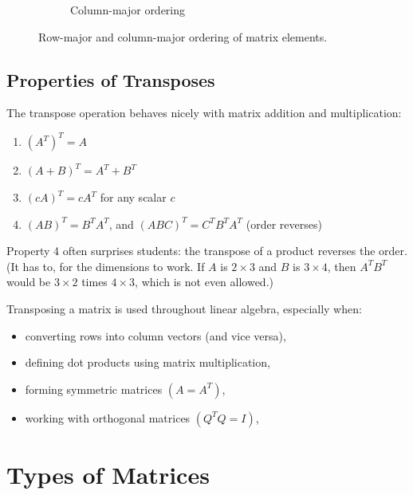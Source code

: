 \begin{figure}[H]
\begin{subfigure}{0.45\textwidth}
        \caption{Column-major ordering}
        \label{fig:col_major}
    \end{subfigure}
    \caption{Row-major and column-major ordering of matrix elements.}
    \label{fig:row_col_major}
\end{figure}
\subsection{Properties of Transposes}

The transpose operation behaves nicely with matrix addition and multiplication:
\begin{enumerate}[label=(\arabic*)]
    \item $(A^T)^T = A$
    \item \((A + B)^T = A^T + B^T\)
    \item \((cA)^T = cA^T\) for any scalar $c$
    \item \((AB)^T = B^T A^T\), and \((ABC)^T = C^T B^T A^T\) (order reverses)
    
\end{enumerate}
Property 4 often surprises students: the transpose of a product reverses the order. (It has to, for the dimensions to work. If $A$ is $2 \times 3$ and $B$ is $3 \times 4$, then $A^T B^T$ would be $3 \times 2$ times $4 \times 3$, which is not even allowed.)

Transposing a matrix is used throughout linear algebra, especially when:
\begin{itemize}
    \item converting rows into column vectors (and vice versa),
    \item defining dot products using matrix multiplication,
    \item forming symmetric matrices \((A = A^T)\),
    \item working with orthogonal matrices \((Q^T Q = I)\),
\end{itemize}

\section{Types of Matrices}

